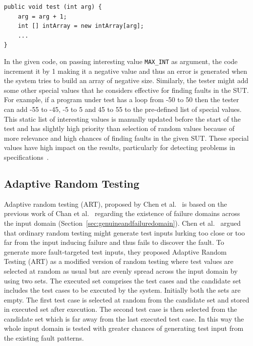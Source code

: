 \begin{lstlisting}
public void test (int arg) {
	arg = arg + 1;
	int [] intArray = new intArray[arg];
	...
}
\end{lstlisting}

In the given code, on passing interesting value \verb+MAX_INT+ as argument, the code increment it by 1 making it a negative value and thus an error is generated when the system tries to build an array of negative size. Similarly, the tester might add some other special values that he considers effective for finding faults in the SUT. For example, if a program under test has a loop from -50 to 50 then the tester can add -55 to -45, -5 to 5 and 45 to 55 to the pre-defined list of special values. This static list of interesting values is manually updated before the start of the test and has slightly high priority than selection of random values because of more relevance and high chances of finding faults in the given SUT. These special values have high impact on the results, particularly for detecting problems in specifications~\cite{ciupa2008finding}.


\subsection{Adaptive Random Testing}
\label{sec:artpatterns_2}
Adaptive random testing (ART), proposed by Chen et al.~\cite{chen2005adaptive} is based on the previous work of Chan et al.~\cite{chan1996proportional} regarding the existence of failure domains across the input domain (Section~\ref{sec:genuineandfailuredomain}). Chen et al.~\cite{chen2005adaptive} argued that ordinary random testing might generate test inputs lurking too close or too far from the input inducing failure and thus fails to discover the fault. To generate more fault-targeted test inputs, they proposed Adaptive Random Testing (ART) as a modified version of random testing where test values are selected at random as usual but are evenly spread across the input domain by using two sets. The executed set comprises the test cases and the candidate set includes the test cases to be executed by the system. Initially both the sets are empty. The first test case is selected at random from the candidate set and stored in executed set after execution. The second test case is then selected from the candidate set which is far away from the last executed test case. In this way the whole input domain is tested with greater chances of generating test input from the existing fault patterns.

